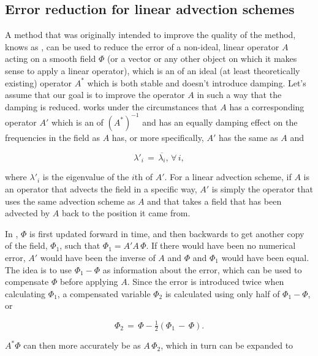 \subsection{Error reduction for linear advection schemes}

A method that was originally intended to improve the quality of the \LS method, knows as \BFECC, can be used to reduce the error of a non-ideal, linear operator $A$ acting on a smooth field $\Phi$ (or a vector or any other object on which it makes sense to apply a linear operator), which is an \approximation of an ideal (at least theoretically existing) operator $A^*$ which is both stable and doesn't introduce damping. Let's assume that our goal is to improve the operator $A$ in such a way that the damping is reduced. \BFECC works under the circumstances that $A$ has a corresponding operator $A'$ which is an \approximation of $(A^*)^{-1}$ and has an equally damping effect on the frequencies in the field as $A$ has, or more specifically, $A'$ has the same \eigenfunctions as $A$ and

\begin{equation}
\lambda'_i \,=\, \overline{\lambda_i}, \,\forall\,i,
\end{equation}

where $\lambda'_i$ is the eigenvalue of the $i$th \eigenfunction of $A'$. For a linear advection scheme, if $A$ is an operator that advects the field in a specific way, $A'$ is simply the operator that uses the same advection scheme as $A$ and that takes a field that has been advected by $A$ back to the position it came from.

In \BFECC, $\Phi$ is first updated forward in time, and then backwards to get another copy of the field, $\Phi_1$, such that $\Phi_1 = A'A\,\Phi$. If there would have been no numerical error, $A'$ would have been the inverse of $A$ and $\Phi$ and $\Phi_1$ would have been equal. The idea is to use $\Phi_1-\Phi$ as information about the error, which can be used to compensate $\Phi$ before applying $A$. Since the error is introduced twice when calculating $\Phi_1$, a compensated variable $\Phi_2$ is calculated using only half of $\Phi_1-\Phi$, or

\begin{equation}
\Phi_2 \,=\, \Phi - \tfrac{1}{2}(\Phi_1 \,-\, \Phi).
\end{equation}

$A^*\Phi$ can then more accurately be \approximated as $A\,\Phi_2$, which in turn can be expanded to

